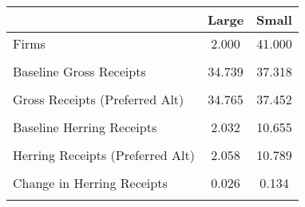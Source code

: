 \begin{tabular}{l*{2}{c}}
\hline\hline
                &    Large&    Small\\
\hline
Firms           &    2.000&   41.000\\
                &         &         \\
Baseline Gross Receipts&   34.739&   37.318\\
                &         &         \\
Gross Receipts (Preferred Alt)&   34.765&   37.452\\
                &         &         \\
Baseline Herring Receipts&    2.032&   10.655\\
                &         &         \\
Herring Receipts  (Preferred Alt)&    2.058&   10.789\\
                &         &         \\
Change in Herring Receipts&    0.026&    0.134\\
                &         &         \\
\hline\hline
\end{tabular}
